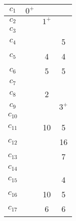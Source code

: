 \documentclass[12pt, a4paper] {ncc}
\begin{document}
\begin{enumerate}
\begin{tabular} {|c|c|c|c|}
    \hline
    $c_{1}$  &$0^+$&      &     \\ \hline
    $c_{2}$  & \z  &$1^+$ &     \\ \hline
    $c_{3}$  & \z  & \z   & \z  \\ \hline
    $c_{4}$  & \z  & \z   & 5   \\ \hline
    $c_{5}$  & \z  & 4    & 4   \\ \hline
    $c_{6}$  & \z  & 5    & 5   \\ \hline
    $c_{7}$  & \z  & \z   & \z  \\ \hline
    $c_{8}$  & \z  & 2    & \z  \\ \hline
    $c_{9}$  & \z  & \z   &$3^+$\\ \hline
    $c_{10}$ & \z  & \z   & \z  \\ \hline
    $c_{11}$ & \z  & 10   &  5  \\ \hline
    $c_{12}$ & \z  & \z   & 16  \\ \hline
    $c_{13}$ & \z  & \z   & 7   \\ \hline
    $c_{14}$ & \z  & \z   & \z  \\ \hline
    $c_{15}$ & \z  & \z   & 4   \\ \hline
    $c_{16}$ & \z  & 10   & 5   \\ \hline
    $c_{17}$ & \z  & 6    & 6   \\ \hline 
\end{tabular}


\end{enumerate}
\end{document}
